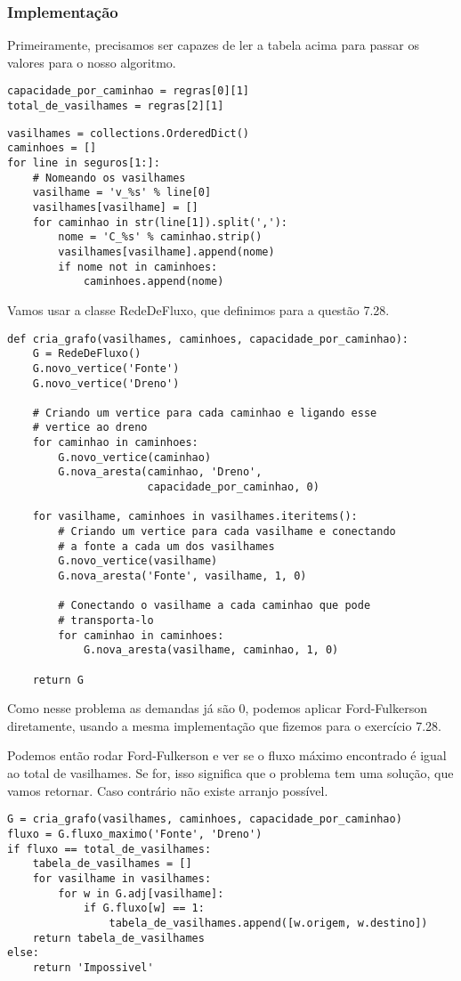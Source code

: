 \documentclass[11pt]{article}
\begin{document}
\subsubsection{Implementação}
\label{sec-2-1-1}

Primeiramente, precisamos ser capazes de ler a tabela acima para
passar os valores para o nosso algoritmo.
\begin{verbatim}
capacidade_por_caminhao = regras[0][1]
total_de_vasilhames = regras[2][1]
\end{verbatim}

\begin{verbatim}
vasilhames = collections.OrderedDict()
caminhoes = []
for line in seguros[1:]:
    # Nomeando os vasilhames
    vasilhame = 'v_%s' % line[0]
    vasilhames[vasilhame] = []
    for caminhao in str(line[1]).split(','):
        nome = 'C_%s' % caminhao.strip()
        vasilhames[vasilhame].append(nome)
        if nome not in caminhoes:
            caminhoes.append(nome)
\end{verbatim}

Vamos usar a classe RedeDeFluxo, que definimos para a questão 7.28.

\begin{verbatim}
def cria_grafo(vasilhames, caminhoes, capacidade_por_caminhao):
    G = RedeDeFluxo()
    G.novo_vertice('Fonte')
    G.novo_vertice('Dreno')

    # Criando um vertice para cada caminhao e ligando esse
    # vertice ao dreno
    for caminhao in caminhoes:
        G.novo_vertice(caminhao)
        G.nova_aresta(caminhao, 'Dreno',
                      capacidade_por_caminhao, 0)

    for vasilhame, caminhoes in vasilhames.iteritems():
        # Criando um vertice para cada vasilhame e conectando
        # a fonte a cada um dos vasilhames
        G.novo_vertice(vasilhame)
        G.nova_aresta('Fonte', vasilhame, 1, 0)

        # Conectando o vasilhame a cada caminhao que pode
        # transporta-lo
        for caminhao in caminhoes:
            G.nova_aresta(vasilhame, caminhao, 1, 0)

    return G
\end{verbatim}

Como nesse problema as demandas já são 0, podemos aplicar
Ford-Fulkerson diretamente, usando a mesma implementação que fizemos
para o exercício 7.28.

Podemos então rodar Ford-Fulkerson e ver se o fluxo máximo encontrado
é igual ao total de vasilhames. Se for, isso significa que o problema
tem uma solução, que vamos retornar. Caso contrário não existe arranjo
possível.
\begin{verbatim}
G = cria_grafo(vasilhames, caminhoes, capacidade_por_caminhao)
fluxo = G.fluxo_maximo('Fonte', 'Dreno')
if fluxo == total_de_vasilhames:
    tabela_de_vasilhames = []
    for vasilhame in vasilhames:
        for w in G.adj[vasilhame]:
            if G.fluxo[w] == 1:
                tabela_de_vasilhames.append([w.origem, w.destino])
    return tabela_de_vasilhames
else:
    return 'Impossivel'
\end{verbatim}
\end{document}
